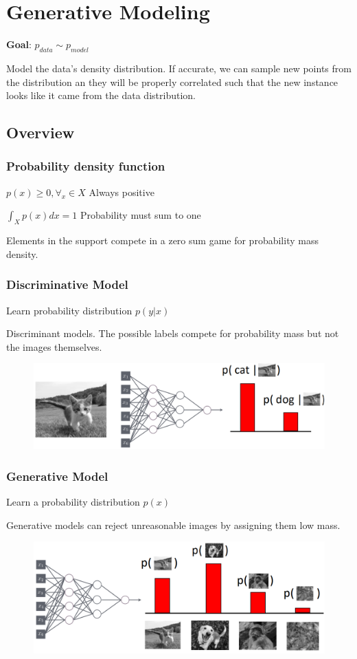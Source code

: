 \section{Generative Modeling}
\textbf{Goal}: \(p_{data} \sim p_{model}\)

Model the data's density distribution.
If accurate, we can sample  new points from the distribution an they will be properly correlated such that the new instance looks like it came from the data distribution.
\subsection{Overview}
\subsubsection{Probability density function}
\(p(x) \ge 0, \forall_x \in X\) Always positive 

\(\int_X p(x)dx = 1\) Probability must sum to one

Elements in the support compete in a zero sum game for probability mass density.
\subsubsection{Discriminative Model}
Learn probability distribution \(p(y|x)\)

Discriminant models.
The possible labels compete for probability mass but not the images themselves.
\begin{figure}[!h]
    \includegraphics[width = \columnwidth]{figures/GenAI1/DiscriminativeModel.png}
\end{figure}


\subsubsection{Generative Model}
Learn a probability distribution \(p(x)\)

Generative models can reject unreasonable images by assigning them low mass.
\begin{figure}[!h]
    \includegraphics[width = \columnwidth]{figures/GenAI1/GenerativeModel.png}
\end{figure}

